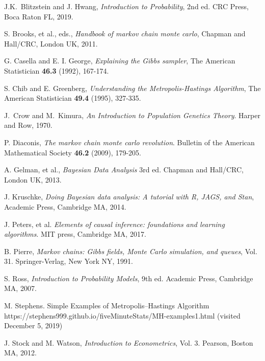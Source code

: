 \documentclass[11pt]{amsart}
\theoremstyle{theorem} %
\theoremstyle{definition}                  %
\theoremstyle{example}                       %
\theoremstyle{remark}                       %
\numberwithin{equation}{section}
\begin{document}
\begin{thebibliography}{9}


 J.K.~Blitzstein and J. Hwang, {\em Introduction to Probability}, 2nd ed. CRC Press, Boca Raton FL, 2019.

 S. Brooks, et al., eds., {\em Handbook of markov chain monte carlo}, Chapman and Hall/CRC, London UK, 2011.

 G. Casella and E. I. George, \emph{Explaining the Gibbs sampler}, The American Statistician \textbf{46.3} (1992), 167-174.

 S. Chib and E. Greenberg, {\em Understanding the Metropolis-Hastings Algorithm}, The American Statistician \textbf{49.4} (1995), 327-335.

 J.~Crow and M.~Kimura, {\em An Introduction to Population Genetics Theory}. Harper and Row, 1970.

 P. Diaconis, {\em The markov chain monte carlo revolution}. Bulletin of the American Mathematical Society \textbf{46.2} (2009), 179-205.

 A. Gelman, et al., {\em Bayesian Data Analysis} 3rd ed. Chapman and Hall/CRC, London UK, 2013.
 

 J. Kruschke, {\em Doing Bayesian data analysis: A tutorial with R, JAGS, and Stan}, Academic Press, Cambridge MA, 2014.

 J. Peters, et al. {\em Elements of causal inference: foundations and learning algorithms}. MIT press, Cambridge MA, 2017.

 B. Pierre, {\em Markov chains: Gibbs fields, Monte Carlo simulation, and queues}, Vol. 31. Springer-Verlag, New York NY, 1991.


 S. Ross, {\em Introduction to Probability Models}, 9th ed. Academic Press, Cambridge MA, 2007.

 M. Stephens. Simple Examples of Metropolis–Hastings Algorithm https://stephens999.github.io/fiveMinuteStats/MH-examples1.html (visited December 5, 2019)

 J. Stock and M. Watson, {\em Introduction to Econometrics}, Vol. 3. Pearson, Boston MA, 2012.



\end{thebibliography}
\end{document}
